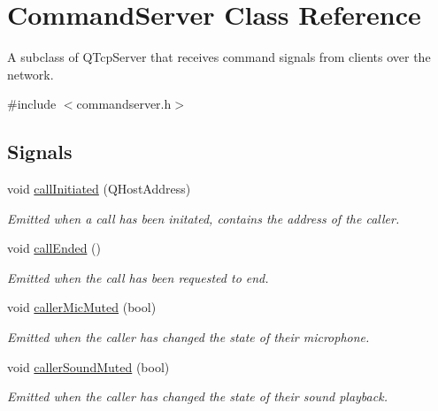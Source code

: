 \hypertarget{class_command_server}{
\section{\-Command\-Server \-Class \-Reference}
\label{class_command_server}
}


\-A subclass of \-Q\-Tcp\-Server that receives command signals from clients over the network.  




{\ttfamily \#include $<$commandserver.\-h$>$}

\subsection*{\-Signals}
\begin{DoxyCompactItemize}
\item 
\hypertarget{class_command_server_aa7fa62273e4e4ceb87d1b77ba9681719}{
void \hyperlink{class_command_server_aa7fa62273e4e4ceb87d1b77ba9681719}{call\-Initiated} (\-Q\-Host\-Address)}
\label{class_command_server_aa7fa62273e4e4ceb87d1b77ba9681719}

\begin{DoxyCompactList}\small\item\em \-Emitted when a call has been initated, contains the address of the caller. \end{DoxyCompactList}\item 
void \hyperlink{class_command_server_a17167b801328d51543128b5a80a39dcc}{call\-Ended} ()
\begin{DoxyCompactList}\small\item\em \-Emitted when the call has been requested to end. \end{DoxyCompactList}\item 
void \hyperlink{class_command_server_ae47dfe7ef7190b1f869c20736b10a6d0}{caller\-Mic\-Muted} (bool)
\begin{DoxyCompactList}\small\item\em \-Emitted when the caller has changed the state of their microphone. \end{DoxyCompactList}\item 
void \hyperlink{class_command_server_a3b7620cfee623cb8b2e9c7c468a36972}{caller\-Sound\-Muted} (bool)
\begin{DoxyCompactList}\small\item\em \-Emitted when the caller has changed the state of their sound playback. \end{DoxyCompactList}\end{DoxyCompactItemize}
